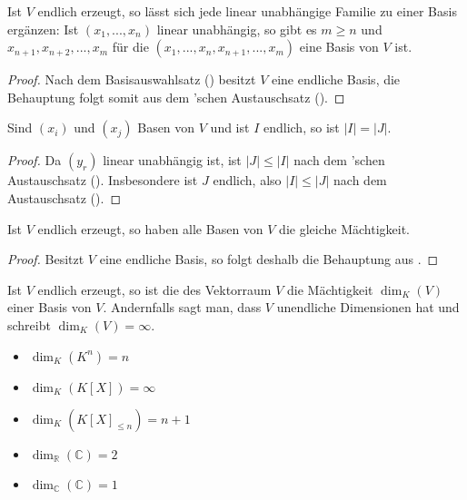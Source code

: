 \begin{conclusion}
	Ist $V$ endlich erzeugt, so lässt sich jede linear unabhängige Familie zu einer Basis ergänzen: 
	Ist $(x_1,...,x_n)$ linear unabhängig, so gibt es $m\ge n$ und $x_{n+1},x_{n+2},...,x_m$ für die $(x_1,...,x_n,
	x_{n+1},...,x_m)$ eine Basis von $V$ ist.
\end{conclusion}
\begin{proof}
	Nach dem Basisauswahlsatz () besitzt $V$ eine endliche Basis, die Behauptung folgt somit aus dem 'schen Austauschsatz ().
\end{proof}

\begin{conclusion}
	Sind $(x_i)$ und $(x_j)$ Basen von $V$ und ist $I$ endlich, so ist $|I|=|J|$.
\end{conclusion}
\begin{proof}
	Da $(y_r)$ linear unabhängig ist, ist $|J|\le |I|$ nach dem 'schen Austauschsatz (). Insbesondere ist $J$ 
	endlich, also $|I|\le |J|$ nach dem Austauschsatz ().
\end{proof}

\begin{conclusion}
	Ist $V$ endlich erzeugt, so haben alle Basen von $V$ die gleiche Mächtigkeit.
\end{conclusion}
\begin{proof}
	Besitzt $V$ eine endliche Basis, so folgt deshalb die Behauptung aus .
\end{proof}

\begin{definition}[Dimension]
	Ist $V$ endlich erzeugt, so ist die  des Vektorraum $V$ die Mächtigkeit $\dim_K(V)$ 
	einer Basis von $V$. Andernfalls sagt man, dass $V$ unendliche Dimensionen hat und schreibt $\dim_K(V)= \infty$. 
\end{definition}

\begin{example}
	\begin{itemize}
		\item $\dim_K(K^n)=n$
		\item $\dim_K(K[X])=\infty$
		\item $\dim_K(K[X]_{\le n})=n+1$
		\item $\dim_{\mathbb R}(\mathbb C)=2$
		\item $\dim_{\mathbb C}(\mathbb C)=1$
	\end{itemize}
\end{example}

